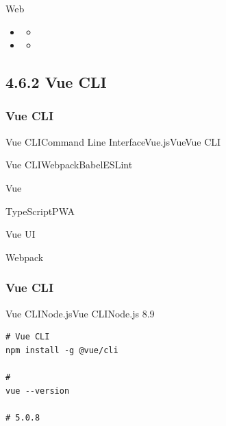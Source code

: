 Web

\important{}

\important{}

\important{}

\important{}

\important{}

\begin{itemize}
\item
  \begin{itemize}
  \tightlist
  \item
  \end{itemize}
\item
  \begin{itemize}
  \tightlist
  \item
  \end{itemize}
\end{itemize}

\hypertarget{vue-cli}{%
\subsection{4.6.2 Vue CLI}\label{vue-cli}}

\hypertarget{vue-cli-1}{%
\subsubsection{Vue CLI}\label{vue-cli-1}}

Vue CLICommand Line InterfaceVue.jsVueVue CLI

Vue CLI\important{}\important{}WebpackBabelESLint


\important{}Vue

\important{}TypeScriptPWA

\important{}Vue UI

\important{}Webpack

\hypertarget{vue-cli-2}{%
\subsubsection{Vue CLI}\label{vue-cli-2}}


Vue CLINode.jsVue CLINode.js 8.9

\begin{lstlisting}[style=terminal]
# Vue CLI
npm install -g @vue/cli

# 
vue --version

# 5.0.8
\end{lstlisting}

